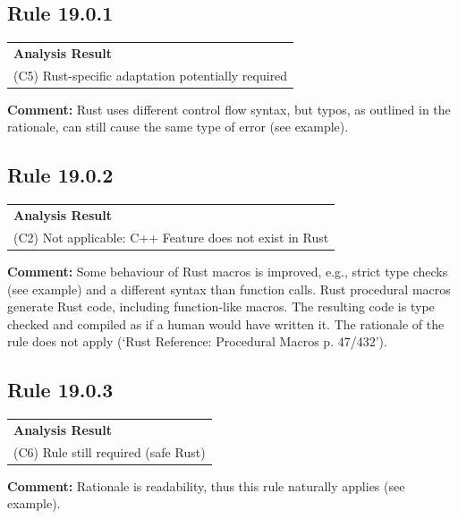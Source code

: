 \subsection*{Rule 19.0.1}
\begin{longtable}{p{13cm}}
\textbf{Analysis Result} \\
(C5) Rust-specific adaptation potentially required \\
\end{longtable}
\textbf{Comment:} Rust uses different control flow syntax, but typos, as outlined in the rationale, can still cause the same type of error (see example). \\


\subsection*{Rule 19.0.2}
\begin{longtable}{p{13cm}}
\textbf{Analysis Result} \\
(C2) Not applicable: C++ Feature does not exist in Rust \\
\end{longtable}
\textbf{Comment:} Some behaviour of Rust macros is improved, e.g., strict type checks (see example) and a different syntax than function calls. Rust procedural macros generate Rust code, including function-like macros. The resulting code is type checked and compiled as if a human would have written it. The rationale of the rule does not apply (`Rust Reference: Procedural Macros p. 47/432'). \\


\subsection*{Rule 19.0.3}
\begin{longtable}{p{13cm}}
\textbf{Analysis Result} \\
(C6) Rule still required (safe Rust) \\
\end{longtable}
\textbf{Comment:} Rationale is readability, thus this rule naturally applies (see example). \\


